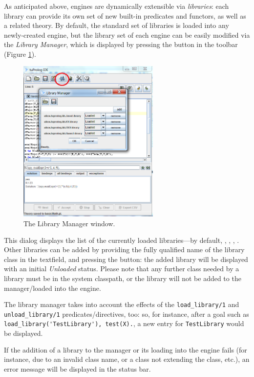 As anticipated above, \tuprolog{} engines are dynamically extensible via \textit{libraries}: each library can provide its own set of new built-in
predicates and functors, as well as a related theory.
%
By default, the standard set of libraries is loaded into any newly-created engine, but the library set of each engine can be easily modified via the \textit{Library Manager}, which is displayed by pressing the  button in the toolbar (Figure \ref{fig:gui-library-manager}).

\begin{figure}
\centering
\includegraphics[width=7cm]{images/gui-library-manager}
\caption{The Library Manager window.}
\label{fig:gui-library-manager}
\end{figure}

This dialog displays the list of the currently loaded libraries---by default,
, , , .
%
Other libraries can be added by providing the fully qualified name of the
library class in the textfield, and pressing the  button: the added library will be displayed with an initial \textit{Unloaded} status.
%
Please note that any further class needed by a library must be in the system classpath, or the library will not be added to the manager/loaded into the engine.

The library manager takes into account the effects of the \verb|load_library/1| and \verb|unload_library/1| predicates/directives, too: so, for instance, after a goal such as \verb|load_library('TestLibrary'), test(X).|, a new entry for \verb|TestLibrary| would be displayed.

If the addition of a library to the manager or its loading into the engine fails (for instance, due to an invalid class name, or a class not extending the
 class, etc.), an error message will be displayed
in the status bar.

